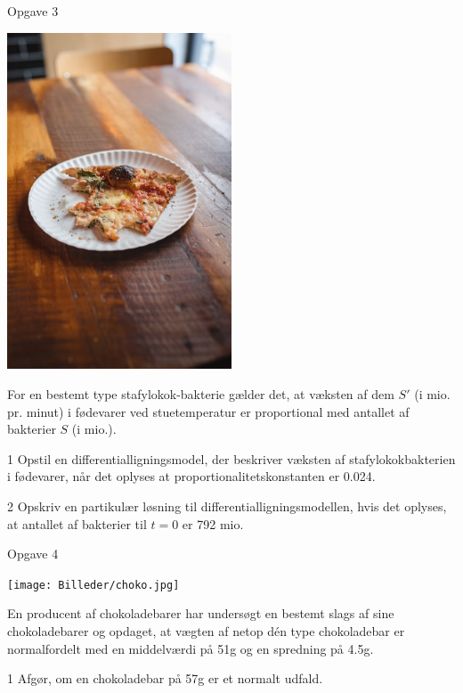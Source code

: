 \begin{opgavetekst}{Opgave 3}
	\begin{center}
		\includegraphics[width=0.5\textwidth]{Billeder/pizza.jpg}
	\end{center}
	For en bestemt type stafylokok-bakterie gælder det, at væksten af dem $S'$ (i mio. pr. minut) i fødevarer ved stuetemperatur er proportional med antallet af bakterier $S$ (i mio.). 
\end{opgavetekst}
\begin{delopgave}{}{1}
	Opstil en differentialligningsmodel, der beskriver væksten af stafylokokbakterien i fødevarer, når det oplyses at proportionalitetskonstanten er 0.024.
\end{delopgave}
\begin{delopgave}{}{2}
	Opskriv en partikulær løsning til differentialligningsmodellen, hvis det oplyses, at antallet af bakterier til $t=0$ er 792 mio. 
\end{delopgave}
\begin{opgavetekst}{Opgave 4 }
	\begin{center}
		\texttt{[image: Billeder/choko.jpg]}
	\end{center}
	En producent af chokoladebarer har undersøgt en bestemt slags af sine chokoladebarer og opdaget, at vægten af netop dén type chokoladebar er normalfordelt
	med en middelværdi på 51g og en spredning på 4.5g.
\end{opgavetekst}
\begin{delopgave}{}{1}
	Afgør, om en chokoladebar på 57g er et normalt udfald. 
\end{delopgave}

